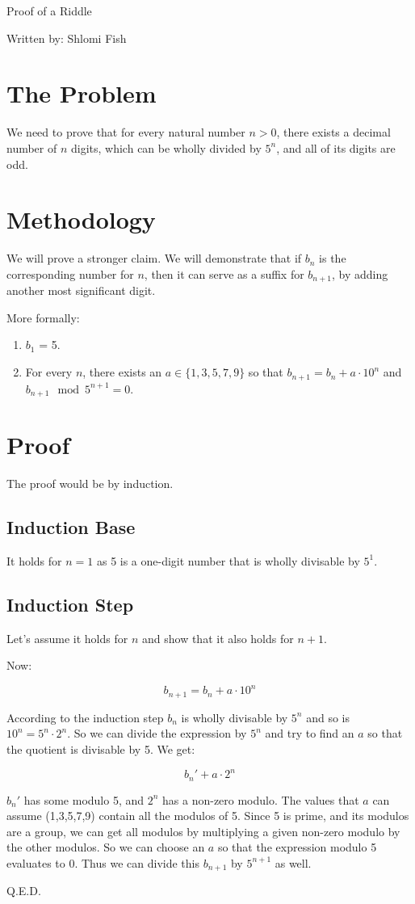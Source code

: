 \documentclass[a4paper]{article}
\begin{document}
{\Huge Proof of a Riddle}

{\LARGE Written by: Shlomi Fish}

\section{The Problem}

We need to prove that for every natural number $n > 0$, there exists a
decimal number of $n$ digits, which can be wholly divided by $5^n$, and
all of its digits are odd.

\section{Methodology}

We will prove a stronger claim. We will demonstrate that if $b_n$ is the
corresponding number for $n$, then it can serve as a suffix for $b_{n+1}$,
by adding another most significant digit.

More formally:

\begin{enumerate}
\item $b_1$ = 5.
\item For every $n$, there exists an $a \in \{1,3,5,7,9\}$ so that
$b_{n+1} = b_n + a \cdot 10^n$ and $b_{n+1} \mod 5^{n+1} = 0 $.
\end{enumerate}

\section{Proof}

The proof would be by induction.

\subsection{Induction Base}

It holds for $n = 1$ as 5 is a one-digit number that is wholly divisable
by $5^1$.

\subsection{Induction Step}

Let's assume it holds for $n$ and show that it also holds for $n+1$.

Now:

\[b_{n+1} = b_n + a \cdot 10^n \]

According to the induction step $b_n$ is wholly divisable by $5^n$ and so
is $10^n = 5^n \cdot 2^n$. So we can divide the expression by $5^n$ and
try to find an $a$ so that the quotient is divisable by 5. We get:

\[ b_{n}' + a \cdot 2^n \]

$b_{n}'$ has some modulo 5, and $2^n$ has a non-zero modulo. The values that
$a$ can assume (1,3,5,7,9) contain all the modulos of 5. Since 5 is prime,
and its modulos are a group, we can get all modulos by multiplying a
given non-zero modulo by the other modulos. So we can choose an $a$ so that
the expression modulo 5 evaluates to 0. Thus we can divide this $b_{n+1}$ by
$5^{n+1}$ as well.

Q.E.D.
\end{document}
